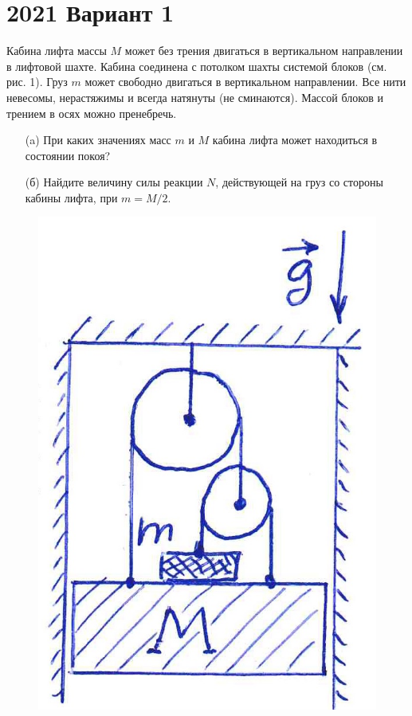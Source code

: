 \section{2021 Вариант 1}

\begin{prob}
Кабина лифта массы $M$ может без трения двигаться в вертикальном направлении в лифтовой шахте. Кабина соединена с потолком шахты системой блоков (см. рис. 1). Груз $m$ может свободно двигаться в вертикальном направлении. Все нити невесомы, нерастяжимы и всегда натянуты (не сминаются). Массой блоков и трением в осях можно пренебречь.
\begin{itemize}
\item[]
\item[(a)] При каких значениях масс $m$ и $M$ кабина лифта может находиться в состоянии покоя?
\item[(б)] Найдите величину силы реакции $N$, действующей на груз со стороны кабины лифта, при $m=M / 2$.
\end{itemize}
\begin{figure}[h!]
\includegraphics[scale=0.25]{IMG/img_1}
\end{figure}
\end{prob}

